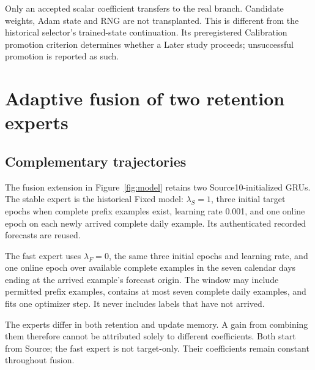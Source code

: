 \documentclass[pdflatex,iicol,sn-mathphys-num]{sn-jnl}
\begin{document}
Only an accepted scalar coefficient transfers to the real branch. Candidate weights, Adam state and RNG are not transplanted. This is different from the historical selector's trained-state continuation. Its preregistered Calibration promotion criterion determines whether a Later study proceeds; unsuccessful promotion is reported as such.

\section{Adaptive fusion of two retention experts}
\subsection{Complementary trajectories}


The fusion extension in Figure~\ref{fig:model} retains two Source10-initialized GRUs. The stable expert is the historical Fixed model: $\lambda_S=1$, three initial target epochs when complete prefix examples exist, learning rate 0.001, and one online epoch on each newly arrived complete daily example. Its authenticated recorded forecasts are reused.

The fast expert uses $\lambda_F=0$, the same three initial epochs and learning rate, and one online epoch over available complete examples in the seven calendar days ending at the arrived example's forecast origin. The window may include permitted prefix examples, contains at most seven complete daily examples, and fits one optimizer step. It never includes labels that have not arrived.

The experts differ in both retention and update memory. A gain from combining them therefore cannot be attributed solely to different coefficients. Both start from Source; the fast expert is not target-only. Their coefficients remain constant throughout fusion.
\end{document}
